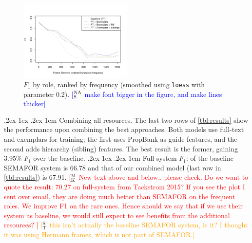 \documentclass[11pt,a4paper]{article}
\makeatletter
\newcommand{\ensuretext}[1]{#1}
\newcommand{\mkmarker}{\ensuretext{\textcolor{red}{\ensuremath{^{\textsc{M}}_{\textsc{K}}}}}}
\newcommand{\stmarker}{\ensuretext{\textcolor{orange}{\ensuremath{^{\textsc{S}}_{\textsc{T}}}}}}
\newcommand{\nasmarker}{\ensuretext{\textcolor{blue}{\ensuremath{^{\textsc{NA}}_{\textsc{S}}}}}}
\newcommand{\arkcomment}[3]{\ensuretext{\textcolor{#3}{[#1 #2]}}}
\newcommand{\mk}[1]{\arkcomment{\mkmarker}{#1}{red}}
\newcommand{\st}[1]{\arkcomment{\stmarker}{#1}{orange}}
\newcommand{\nascomment}[1]{\arkcomment{\nasmarker}{#1}{blue}}
\renewcommand{\paragraph}{%
  \@startsection{paragraph}{4}%
  {\z@}{.2ex \@plus 1ex \@minus .2ex}{-1em}%
  {\normalfont\normalsize\bfseries}%
}
\makeatother
\begin{document}
\begin{figure}[t]
		\includegraphics[width=0.5\textwidth]{fig/f1_sorted_by_num_instances}
\caption{\label{fig:coolplot}$F_1$ by role, ranked by frequency
  (smoothed using \texttt{loess} with parameter 0.2). \nascomment{make
  font bigger in the figure, and make lines thicker}}
\end{figure}


\paragraph{Combining all resources.} The last two rows of 
\cref{tbl:results} show the performance upon combining the best
approaches.  Both models use full-text and exemplars for training; the
first uses PropBank as guide features, and the second adds hierarchy (sibling) features.  
The best result is the former, gaining 3.95\% $F_1$ over the baseline.
\paragraph{Full-system $F_1$}: of the baseline SEMAFOR system is 
66.78 and that of our combined model (last row in \cref{tbl:results}) is 67.91.
\mk{New text above and below.. please check. Do we want to quote the result: 70.27 on full-system 
from Tackstrom 2015? If you see the plot I sent over email, they
are doing much better than SEMAFOR on the frequent roles. We improve F1 on the rare ones.
Hence should we say that if we use their system as baseline, we would still
expect to see benefits from the additional resources? }
\st{this isn't actually the baseline SEMAFOR system, is it? I thought it was
using Hermann frames, which is not part of SEMAFOR.}
\end{document}
